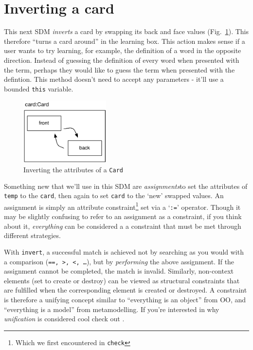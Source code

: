 \newpage
\hypertarget{sec:invertCard}{}
\section{Inverting a card}
\genHeader

This next SDM \emph{inverts} a card by swapping its back and face values (Fig.~\ref{fig:goal_invert}). This therefore ``turns a card around'' in the learning
box. This action makes sense if a user wants to try learning, for example, the definition of a word in the opposite direction. Instead of guessing the
definition of every word when presented with the term, perhaps they would like to guess the term when presented with the defintion. This method doesn't need to
accept any parameters - it'll use a bounded \texttt{this} variable.

\vspace{0.5cm}

\begin{figure}[htbp]
	\centering
    \includegraphics[width=0.4\textwidth]{goal_invert.pdf}
 	\caption{Inverting the attributes of a \texttt{Card}}
 	\label{fig:goal_invert}
\end{figure}
\FloatBarrier

Something new that we'll use in this SDM are \emph{assignments}to set the attributes of \texttt{temp} to the \texttt{card}, then again to
set \texttt{card} to the `new' swapped values. An assignment is simply an attribute constraint\footnote{Which we first encountered in \texttt{check}} set via a
`\texttt{:=}' operator. Though it may be slightly confusing to refer to an assignment as a constraint, if you think about it, \emph{everything} can be
considered a a constraint that must be met through different strategies.

With \texttt{invert}, a successful match is achieved not by searching as you would with a comparison (\texttt{==, >, <, \ldots}), but by \emph{performing} the
above assignment. If the assignment cannot be completed, the match is invalid. Similarly, non-context elements (set to create or destroy) can be viewed as
structural constraints that are fulfilled when the corresponding element is created or destroyed.  A constraint is therefore a unifying concept similar to
``everything is an object'' from OO, and ``everything is a model'' from metamodelling.  If you're interested in why \emph{unification} is considered cool check
out \cite{BEZ05}.









